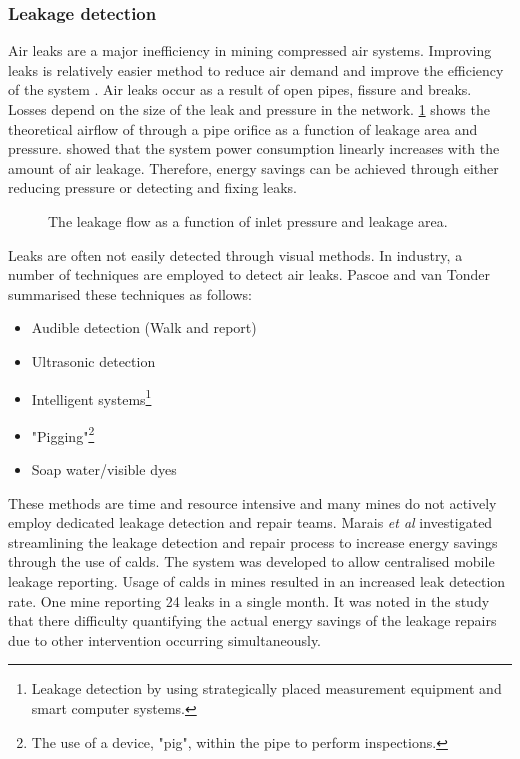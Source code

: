 		 \subsubsection{Leakage detection}	 
		 Air leaks are a major inefficiency in mining compressed air systems. Improving leaks is relatively easier method to  reduce air demand and improve the efficiency of the system \cite{van2011sustaining}. Air leaks occur as a result of open pipes, fissure and breaks. Losses depend on the size of the leak and pressure in the network. \cref{fig: Leak losses} shows the theoretical airflow of through a pipe orifice as a function of leakage area and pressure\footnotemark[1]. \cite{van2011sustaining} showed that the system power consumption linearly increases with the amount of air leakage. Therefore, energy savings can be achieved through either reducing pressure or detecting and fixing leaks.
		 \begin{figure}[h]
		 	\centering
		 	\fbox{\hspace{2cm}\hspace{2cm}}
		 	\caption[The leakage flow as a function of inlet pressure and leakage area]{ The leakage flow as a function of inlet pressure and leakage area\protect\footnotemark[1].}
		 	\label{fig: Leak losses}
		 \end{figure}
	 \par 
		 Leaks are often not easily detected through visual methods. In industry, a number of techniques are employed to detect air leaks. Pascoe \cite{Pascoe2016Masters} and van Tonder \cite{vanTonder2010Masters} summarised these techniques as follows:
		 \begin{itemize}
		 	\item Audible detection (Walk and report)
		 	\item Ultrasonic detection
		 	\item Intelligent systems\footnote{Leakage detection by using strategically placed measurement equipment and smart computer systems.}
		 	\item "Pigging"\footnote{The use of a device, "pig", within the pipe to perform inspections.}
		 	\item Soap water/visible dyes 
		 \end{itemize}
	 	 These methods are time and resource intensive and many mines do not actively employ dedicated leakage detection and repair teams. Marais \textit{et al} \cite{marais2009increased} investigated streamlining the leakage detection and repair process to increase energy savings through the use of \gls{calds}. The system was developed to allow centralised mobile leakage reporting. Usage of \gls{calds} in mines resulted in an increased leak detection rate. One mine reporting 24 leaks in a single month. It was noted in the study that there difficulty quantifying the actual energy savings of the leakage repairs due to other intervention occurring simultaneously.	
		 
